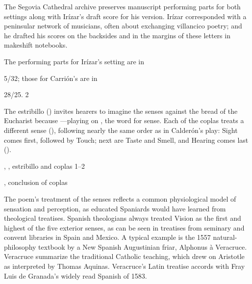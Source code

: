The Segovia Cathedral archive preserves manuscript performing parts for both settings along with Irízar's draft score for his version.
Irízar corresponded with a peninsular network of musicians, often about exchanging villancico poetry; and he drafted his scores on the backsides and in the margins of these letters in makeshift notebooks.
\begin{Footnote}
    The performing parts for Irízar's setting are in \signature{E-SE}{5/32}; those for Carrión's are in \signature{E-SE}{28/25}.
2\end{Footnote}

The estribillo () invites hearers to imagine the senses  against the bread of the Eucharist because ---playing on , the word for sense.
Each of the coplas treats a different sense (), following nearly the same order as in Calderón's play: 
Sight comes first, followed by Touch; next are Taste and Smell, and Hearing comes last ().

\begin{expoem}
    \caption{, , estribillo and coplas 1--2}
    \label{expoem:Si_los_sentidos-Sanchez-estribillo}
\end{expoem}
\begin{expoem}
    \caption{, conclusion of coplas}
    \label{expoem:Si_los_sentidos-Sanchez-coplas}
\end{expoem}


The poem's treatment of the senses reflects a common physiological model of sensation and perception, as educated Spaniards would have learned from theological treatises.
Spanish theologians always treated Vision as the first and highest of the five exterior senses, as can be seen in treatises from seminary and convent libraries in Spain and Mexico.
A typical example is the 1557 natural-philosophy textbook  by a New Spanish Augustinian friar, Alphonus à Veracruce.%
    \Autocite{Veracruce:Phisica}
Veracruce summarize the traditional Catholic teaching, which drew on Aristotle as interpreted by Thomas Aquinas.%
Veracruce's Latin treatise accords with Fray Luis de Granada's widely read Spanish  of 1583.%
    \Autocites{LuisdeGranada:Simbolo}[(part I)]{LuisdeGranada-Balcells:SimboloPtI}

